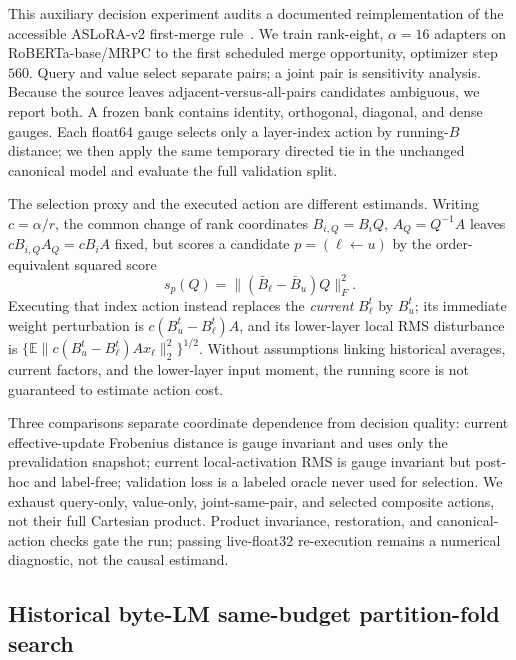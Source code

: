 This auxiliary decision experiment audits a documented reimplementation of the
accessible ASLoRA-v2 first-merge rule~\citep{hu2024aslorav2}.  We train
rank-eight, $\alpha=16$ adapters on
RoBERTa-base/MRPC to the first scheduled merge opportunity, optimizer step
$560$.  Query and value select separate pairs; a joint pair is sensitivity
analysis.  Because the source leaves adjacent-versus-all-pairs candidates
ambiguous, we report both.  A frozen bank contains identity, orthogonal,
diagonal, and dense gauges.  Each float64 gauge selects only a layer-index
action by running-$B$ distance; we then apply the same temporary directed tie
in the unchanged canonical model and evaluate the full validation split.

The selection proxy and the executed action are different estimands.  Writing
$c=\alpha/r$, the common change of rank coordinates
$B_{i,Q}=B_iQ$, $A_Q=Q^{-1}A$ leaves
$cB_{i,Q}A_Q=cB_iA$ fixed, but scores a candidate
$p=(\ell\leftarrow u)$ by the order-equivalent squared score
\begin{equation}
 s_p(Q)=\|({\bar B}_\ell-{\bar B}_u)Q\|_F^2.
 \label{eq:aslora_selection_score}
\end{equation}
Executing that index action instead replaces the \emph{current} $B_\ell^t$
by $B_u^t$; its immediate weight perturbation is
$c(B_u^t-B_\ell^t)A$, and its lower-layer local RMS disturbance is
$\{\mathbb E\|c(B_u^t-B_\ell^t)Ax_\ell\|_2^2\}^{1/2}$.  Without assumptions
linking historical averages, current factors, and the lower-layer input
moment, the running score is not guaranteed to estimate action cost.

Three comparisons separate coordinate dependence from decision quality:
current effective-update Frobenius distance is gauge invariant and uses only
the prevalidation snapshot; current local-activation RMS is gauge invariant
but post-hoc and label-free; validation loss is a labeled oracle never used for
selection.  We exhaust query-only, value-only, joint-same-pair, and selected
composite actions, not their full Cartesian product.  Product invariance,
restoration, and canonical-action checks gate the run; passing live-float32
re-execution remains a numerical diagnostic, not the causal estimand.

\subsection{Historical byte-LM same-budget partition-fold search}

